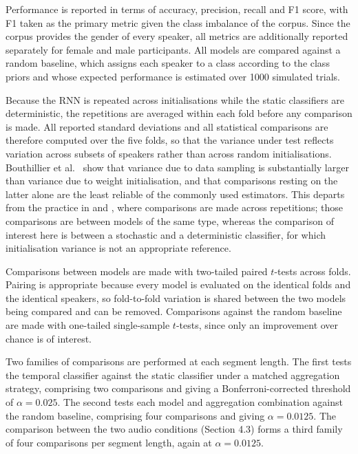 \documentclass{mproj}
\begin{document}
Performance is reported in terms of accuracy, precision, recall and F1 score, with F1 taken as the primary metric given the class imbalance of the corpus. Since the corpus provides the gender of every speaker, all metrics are additionally reported separately for female and male participants. All models are compared against a random baseline, which assigns each speaker to a class according to the class priors and whose expected performance is estimated over 1000 simulated trials.

Because the RNN is repeated across initialisations while the static classifiers are deterministic, the repetitions are averaged within each fold before any comparison is made. All reported standard deviations and all statistical comparisons are therefore computed over the five folds, so that the variance under test reflects variation across subsets of speakers rather than across random initialisations. Bouthillier et al.\ \cite{bouthillier2021} show that variance due to data sampling is substantially larger than variance due to weight initialisation, and that comparisons resting on the latter alone are the least reliable of the commonly used estimators. This departs from the practice in \cite{alsofyani2021} and \cite{alsarrani2025}, where comparisons are made across repetitions; those comparisons are between models of the same type, whereas the comparison of interest here is between a stochastic and a deterministic classifier, for which initialisation variance is not an appropriate reference.

Comparisons between models are made with two-tailed paired $t$-tests across folds. Pairing is appropriate because every model is evaluated on the identical folds and the identical speakers, so fold-to-fold variation is shared between the two models being compared and can be removed. Comparisons against the random baseline are made with one-tailed single-sample $t$-tests, since only an improvement over chance is of interest.

Two families of comparisons are performed at each segment length. The first tests the temporal classifier against the static classifier under a matched aggregation strategy, comprising two comparisons and giving a Bonferroni-corrected threshold of $\alpha = 0.025$. The second tests each model and aggregation combination against the random baseline, comprising four comparisons and giving $\alpha = 0.0125$. The comparison between the two audio conditions (Section 4.3) forms a third family of four comparisons per segment length, again at $\alpha = 0.0125$.
\end{document}
